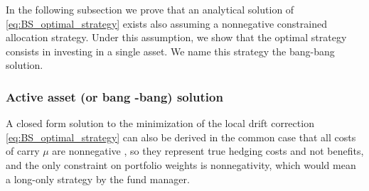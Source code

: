 \documentclass[runningheads]{m2ef}
\newcommand{\change}[1]{{\color{red} {#1}}}%
\begin{document}
\change{In the following subsection we prove that an analytical solution of \eqref{eq:BS_optimal_strategy} exists also assuming a nonnegative constrained allocation strategy. Under this assumption, we show that the optimal strategy consists in investing in a single asset. We name this strategy the bang-bang solution.}

\subsubsection{Active \change{a}sset (or \change{b}ang\change{-b}ang) \change{s}olution}
A closed form solution to the minimization of the local drift correction \eqref{eq:BS_optimal_strategy} can also be derived in the common case that all costs of carry \change{$\mu$} are nonnegative\change{, so they represent true hedging costs and not benefits,} and the only constraint on portfolio weights is nonnegativity, which would mean a long-only strategy by the fund manager.
\end{document}
